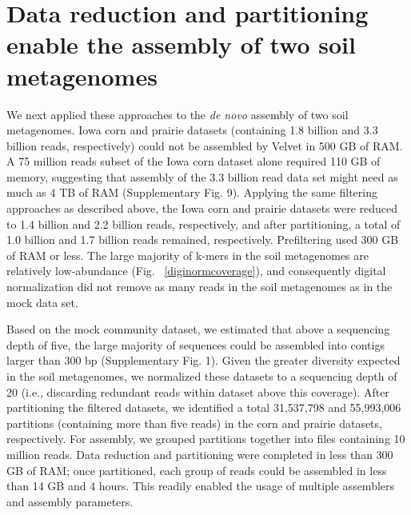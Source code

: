 \documentclass{nature}%
\begin{document}
\section*{Data reduction and partitioning enable the assembly of two soil metagenomes}

We next applied these approaches to the {\em de novo} assembly of two
soil metagenomes.  Iowa corn and prairie datasets (containing 1.8
billion and 3.3 billion reads, respectively) could not be assembled by
Velvet in 500 GB of RAM.  A 75 million reads subset of the Iowa corn
dataset alone required 110 GB of memory, suggesting that assembly of
the 3.3 billion read data set might need as much as 4 TB of RAM
(Supplementary Fig. 9).  Applying the same filtering approaches as described
above, the Iowa corn and prairie datasets were reduced to 1.4 billion
and 2.2 billion reads, respectively, and after partitioning, a total
of 1.0 billion and 1.7 billion reads remained, respectively.  Prefiltering
used 300 GB of RAM or less.  The
large majority of k-mers in the soil metagenomes are relatively
low-abundance (Fig. ~\ref{diginormcoverage}), and consequently digital
normalization did not remove as many reads in the soil metagenomes as
in the mock data set.

Based on the mock community dataset, we estimated that above a
sequencing depth of five, the large majority of sequences could be
assembled into contigs larger than 300 bp (Supplementary Fig. 1).  Given the
greater diversity expected in the soil metagenomes, we normalized
these datasets to a sequencing depth of 20 (i.e., discarding redundant 
reads within dataset above this coverage).  
After partitioning the filtered datasets, we identified a total
31,537,798 and 55,993,006 partitions (containing more than five reads)
in the corn and prairie datasets, respectively.  For assembly, we
grouped partitions together into files containing 10 million reads.
Data reduction and partitioning were completed in less than 300 GB of
RAM; once partitioned, each group of reads could be assembled in less
than 14 GB and 4 hours.  This readily enabled the usage of multiple
assemblers and assembly parameters.
\end{document}
